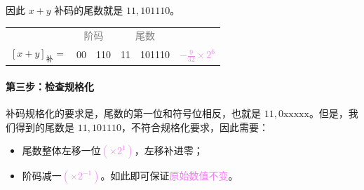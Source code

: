 \documentclass[UTF8]{ctexart}
\newcommand\littleword[1]{\textcolor{gray}{\footnotesize #1}}
\begin{document}
\BgThispage
因此 $x+y$ 补码的尾数就是 $11,101110$。

\begin{table}[htb]
  \centering
  \begin{tabular}{cc@{\ ,\ }c@{\quad ;\quad }c@{\ ,\ }c@{\qquad}c}
    & \multicolumn{2}{c}{\littleword{阶码}} & \multicolumn{2}{c}{\littleword{尾数}} & \\
    $[x+y]_{\text{补}} = $ & 00 & 110 & 11 & 101110 & \textcolor{violet}{$-\frac{9}{32}\times 2^6$} \\
  \end{tabular}
\end{table}

\paragraph{第三步：检查规格化} 补码规格化的要求是，尾数的第一位和符号位相反，也就是 $11,0\text{xxxxx}$。但是，我们得到的尾数是 $11,101110$，不符合规格化要求，因此需要：
\begin{itemize}[itemsep=0pt,parsep=0pt]
  \item 尾数整体左移一位\textcolor{violet}{$(\times 2^1)$}，左移\textcolor{green!70!black}{补进零}；
  \item 阶码减一\textcolor{violet}{$(\times 2^{-1})$}。如此即可保证\textcolor{violet}{原始数值不变}。
\end{itemize}
\end{document}
